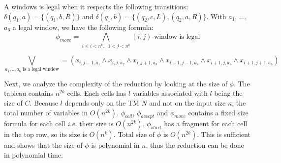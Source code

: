 \documentclass[letterpaper]{article}
\begin{document}
A windows is legal when it respects the following transitions:
$\delta(q_1, a) = \{(q_1, b, R)\}$
and $\delta(q_1, b) = \{(q_2, c, L), (q_2, a, R)\}$.
With $a_1$, ..., $a_6$ a legal window, we have the following formula: \\

$$
\phi_{move} = \bigwedge_{i \le i < n^k, \;\; 1 < j < n^k}
\text{$(i, j)$-window is legal}
$$

$$
\bigvee_{a_1, .., a_6\text{  is a legal window}} = (x_{i, j-1, a_1} \wedge
x_{i, j, a_2} \wedge
x_{i, j+1, a_3} \wedge
x_{i+1, j-1, a_4} \wedge
x_{i+1, j, a_5} \wedge
x_{i+1, j+1, a_6})
$$

Next, we analyze the complexity of the reduction
by looking at the size of $\phi$. The tableau contains $n^{2k}$ cells.
Each cells has $l$ variables associated with $l$ being the size of $C$.
Because $l$ depends only on the TM $N$ and not on the input size $n$,
the total
number of variables in $O(n^{2k})$. $\phi_{cell}$,
$\phi_{accept}$ and $\phi_{move}$ contains a fixed size
formula for each cell \textit{i.e.} their size is $O(n^{2k})$.
$\phi_{start}$ has a fragment for
each cell in the top row, so its size is $O(n^k)$. Total size of $\phi$
is $O(n^{2k})$. This is sufficient and shows that the size of $\phi$ is
polynomial in $n$, thus the reduction can be done in polynomial time.
\end{document}
